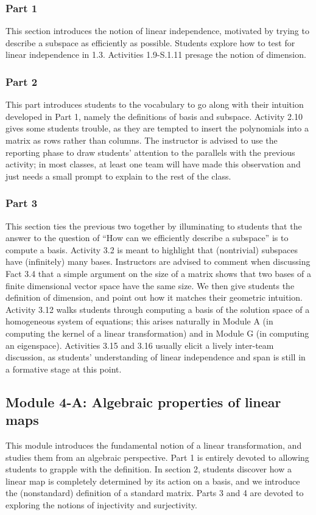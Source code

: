 \documentclass{article}
\begin{document}
\subsubsection*{Part 1}
This section introduces the notion of linear independence, motivated by trying to describe a subspace as efficiently as possible.  Students explore how to test for linear independence in 1.3.  Activities 1.9-S.1.11 presage the notion of dimension.  

\subsubsection*{Part 2}
This part introduces students to the vocabulary to go along with their intuition developed in Part 1, namely the definitions of basis and subspace.  Activity 2.10 gives some students trouble, as they are tempted to insert the polynomials into a matrix as rows rather than columns.  The instructor is advised to use the reporting phase to draw students' attention to the parallels with the previous activity; in most classes, at least one team will have made this observation and just needs a small prompt to explain to the rest of the class.  

\subsubsection*{Part 3}
This section ties the previous two together by illuminating to students that the answer to the question of ``How can we efficiently describe a subspace'' is to compute a basis.  Activity 3.2 is meant to highlight that (nontrivial) subspaces have (infinitely) many bases.  Instructors are advised to comment when discussing Fact 3.4 that a simple argument on the size of a matrix shows that two bases of a finite dimensional vector space have the same size.  We then give students the definition of dimension, and point out how it matches their geometric intuition.  Activity 3.12 walks students through computing a basis of the solution space of a homogeneous system of equations; this arises naturally in Module A (in computing the kernel of a linear transformation) and in Module G (in computing an eigenspace).  Activities 3.15 and 3.16 usually elicit a lively inter-team discussion, as students' understanding of linear independence and span is still in a formative stage at this point.

\subsection*{Module 4-A: Algebraic properties of linear maps}
This module introduces the fundamental notion of a linear transformation, and studies them from an algebraic perspective.   Part 1 is entirely devoted to allowing students to grapple with the definition.  In section 2, students discover how a linear map is completely determined by its action on a basis, and we introduce the (nonstandard) definition of a standard matrix.  Parts 3 and 4 are devoted to exploring the notions of injectivity and surjectivity.
\end{document}
